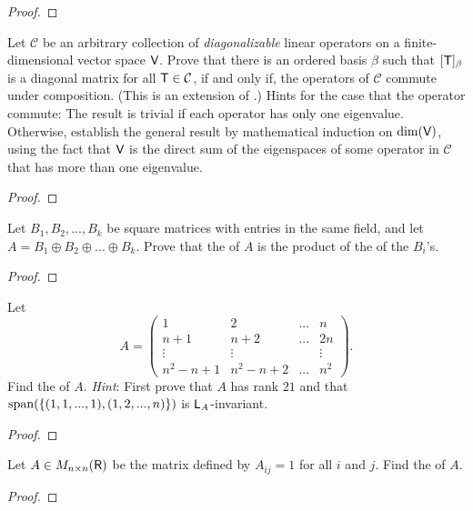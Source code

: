 \begin{proof}
\end{proof}

\begin{exercise} \label{exercise 5.4.38}
Let \(\mathcal{C}\) be an arbitrary collection of \emph{diagonalizable} linear operators on a finite-dimensional vector space \(\textsf{V}\).
Prove that there is an ordered basis \(\beta\) such that \([\textsf{T}]_{\beta}\) is a diagonal matrix for all \(\textsf{T} \in \mathcal{C}\), if and only if, the operators of \(\mathcal{C}\) commute under composition.
(This is an extension of .)
Hints for the case that the operator commute:
The result is trivial if each operator has only one eigenvalue.
Otherwise, establish the general result by mathematical induction on \(\dim(\textsf{V})\), using the fact that \(\textsf{V}\) is the direct sum of the eigenspaces of some operator in \(\mathcal{C}\) that has more than one eigenvalue.
\end{exercise}

\begin{proof}
\end{proof}

\begin{exercise} \label{exercise 5.4.39}
Let \(B_1, B_2, ..., B_k\) be square matrices with entries in the same field, and let \(A = B_1 \oplus B_2 \oplus ... \oplus B_k\).
Prove that the \CPOLY{} of \(A\) is the product of the \CPOLY{} of the \(B_i\)'s.
\end{exercise}

\begin{proof}
\end{proof}

\begin{exercise} \label{exercise 5.4.40}
Let
\[
    A = \begin{pmatrix}
        1 & 2 & ... & n \\
        n + 1 & n + 2  & ... & 2n \\
        \vdots & \vdots & & \vdots \\
        n^2 - n + 1 & n^2 - n + 2 & ... & n^2
    \end{pmatrix}.
\]
\sloppy Find the \CPOLY{} of \(A\).
\emph{Hint}: First prove that \(A\) has rank \(21\) and that \(\operatorname{span}(\{ (1, 1, ... , 1), (1, 2, ..., n) \})\) is \(\textsf{L}_A\)-invariant.
\end{exercise}

\begin{proof}
\end{proof}

\begin{exercise} \label{exercise 5.4.41}
Let \(A \in M_{n \times n}(\textsf{R})\) be the matrix defined by \(A_{ij} = 1\) for all \(i\) and \(j\).
Find the \CPOLY{} of \(A\).
\end{exercise}

\begin{proof}
\end{proof}